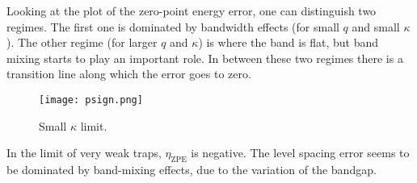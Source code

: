 \documentclass[twocolumn, 10pt, aps, superscriptaddress, floatfix, showpacs, prb, citeautoscript]{revtex4-1}
\begin{document}
Looking at the plot of the zero-point energy error, one can
distinguish two regimes. The first one is dominated by bandwidth
effects (for small $q$ and small $\kappa$). The other regime (for
larger $q$ and $\kappa$) is where the band is flat, but band mixing
starts to play an important role. In between these two regimes there
is a transition line along which the error goes to zero.


\begin{figure}[htb]
  \centerline{\texttt{[image: psign.png]}}
  \caption{Small $\kappa$ limit.}
  \label{fig:error_small_kappa}
\end{figure}


In the limit of very weak traps, $\eta_{\text{ZPE}}$ is negative.
The level spacing error seems to be dominated by band-mixing effects, due to the variation of the bandgap.
\end{document}
